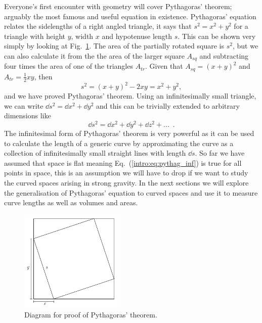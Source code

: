 Everyone's first encounter with geometry will cover Pythagoras' theorem; arguably the most famous and useful equation in existence. Pythagoras' equation relates the sidelengths of a right angled triangle, it says that $s^2 = x^2 + y^2$ for a triangle with height $y$, width $x$ and hypotenuse length $s$. This can be shown very simply by looking at Fig.~\ref{intro:fig:pythag_proof}. The area of the partially rotated square is $s^2$, but we can also calculate it from the the area of the larger square $A_{sq}$ and subtracting four times the area of one of the triangles $A_{tr}$. Given that $A_{sq} = (x+y)^2$ and $A_{tr} = \frac{1}{2}xy$, then
\begin{equation}
s^2 = (x+y)^2-2xy = x^2 + y^2,
\end{equation}
and we have proved Pythagoras' theorem. Using an infinitesimally small triangle, we can write $\dd s^2 = \dd x^2 + \dd y^2$ and this can be trivially extended to arbitrary dimensions like
\begin{equation}\label{intro:eq:pythag_inf}
\dd s^2 = \dd x^2 + \dd y^2 + \dd z^2 + ...\,\,\,.
\end{equation}
The infinitesimal form of Pythagoras' theorem is very powerful as it can be used to calculate the length of a generic curve by approximating the curve as a collection of infinitesimally small straight lines with length $\dd s$. So far we have assumed that space is flat meaning Eq.~(\ref{intro:eq:pythag_inf}) is true for all points in space, this is an assumption we will have to drop if we want to study the curved spaces arising in strong gravity. In the next sections we will explore the generalisation of Pythagoras' equation to curved spaces and use it to measure curve lengths as well as volumes and areas.

\begin{figure}[h]
\centering
    \includegraphics[width=0.45\textwidth]{pics/pythag_proof2.png}
    \caption{Diagram for proof of Pythagoras' theorem.}
    \label{intro:fig:pythag_proof}
\end{figure}


